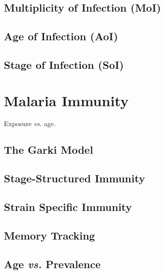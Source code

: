 \documentclass[
]{book}
\begin{document}
\hypertarget{multiplicity-of-infection-moi}{%
\section{Multiplicity of Infection (MoI)}\label{multiplicity-of-infection-moi}}

\hypertarget{age-of-infection-aoi}{%
\section{Age of Infection (AoI)}\label{age-of-infection-aoi}}

\hypertarget{stage-of-infection-soi}{%
\section{Stage of Infection (SoI)}\label{stage-of-infection-soi}}

\hypertarget{malaria-immunity}{%
\chapter{Malaria Immunity}\label{malaria-immunity}}

Exposure \emph{vs.} age.

\hypertarget{the-garki-model}{%
\section{The Garki Model}\label{the-garki-model}}

\hypertarget{stage-structured-immunity}{%
\section{Stage-Structured Immunity}\label{stage-structured-immunity}}

\hypertarget{strain-specific-immunity}{%
\section{Strain Specific Immunity}\label{strain-specific-immunity}}

\hypertarget{memory-tracking}{%
\section{Memory Tracking}\label{memory-tracking}}

\hypertarget{age-vs.-prevalence}{%
\section{\texorpdfstring{Age \emph{vs.} Prevalence}{Age vs. Prevalence}}\label{age-vs.-prevalence}}
\end{document}
